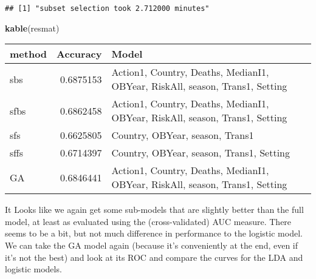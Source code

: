 \documentclass[]{article}
\newenvironment{Shaded}{\begin{snugshade}}{\end{snugshade}}
\newcommand{\CommentTok}[1]{\textcolor[rgb]{0.56,0.35,0.01}{\textit{#1}}}
\newcommand{\DataTypeTok}[1]{\textcolor[rgb]{0.13,0.29,0.53}{#1}}
\newcommand{\DecValTok}[1]{\textcolor[rgb]{0.00,0.00,0.81}{#1}}
\newcommand{\KeywordTok}[1]{\textcolor[rgb]{0.13,0.29,0.53}{\textbf{#1}}}
\newcommand{\NormalTok}[1]{#1}
\newcommand{\OperatorTok}[1]{\textcolor[rgb]{0.81,0.36,0.00}{\textbf{#1}}}
\newcommand{\StringTok}[1]{\textcolor[rgb]{0.31,0.60,0.02}{#1}}
\begin{document}
\begin{verbatim}
## [1] "subset selection took 2.712000 minutes"
\end{verbatim}

\begin{Shaded}
\begin{Highlighting}[]
\KeywordTok{kable}\NormalTok{(resmat)}
\end{Highlighting}
\end{Shaded}

\begin{longtable}[]{@{}lrl@{}}
\toprule
method & Accuracy & Model\tabularnewline
\midrule
\endhead
sbs & 0.6875153 & Action1, Country, Deaths, MedianI1, OBYear, RiskAll,
season, Trans1, Setting\tabularnewline
sfbs & 0.6862458 & Action1, Country, Deaths, MedianI1, OBYear, RiskAll,
season, Trans1, Setting\tabularnewline
sfs & 0.6625805 & Country, OBYear, season, Trans1\tabularnewline
sffs & 0.6714397 & Country, OBYear, season, Trans1,
Setting\tabularnewline
GA & 0.6846441 & Action1, Country, Deaths, MedianI1, OBYear, RiskAll,
season, Trans1, Setting\tabularnewline
\bottomrule
\end{longtable}

It Looks like we again get some sub-models that are slightly better than
the full model, at least as evaluated using the (cross-validated) AUC
measure. There seems to be a bit, but not much difference in performance
to the logistic model. We can take the GA model again (because it's
conveniently at the end, even if it's not the best) and look at its ROC
and compare the curves for the LDA and logistic models.

\begin{Shaded}
\end{Shaded}
\end{document}
